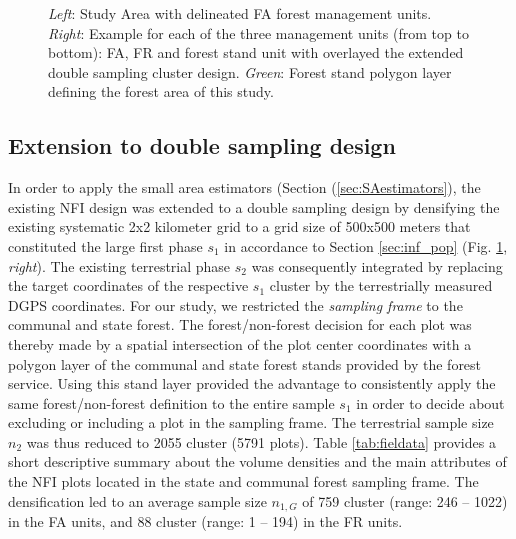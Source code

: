 \begin{figure}[H]
	\centering
	\caption{\textit{Left}: Study Area with delineated FA forest management units. \textit{Right}: Example for each of the three management units (from top to bottom): FA, FR and forest stand unit with overlayed the extended double sampling cluster design. \textit{Green}: Forest stand polygon layer defining the forest area of this study.}
	\label{fig:StudyArea}
\end{figure}

\subsection{Extension to double sampling design}
\label{ext_to_2phase}

In order to apply the small area estimators (Section (\ref{sec:SAestimators}), the existing NFI design was extended to a double sampling design by densifying the existing systematic 2x2 kilometer grid to a grid size of 500x500 meters that constituted the large first phase $s_1$ in accordance to Section \ref{sec:inf_pop} (Fig. \ref{fig:StudyArea}, \textit{right}). The existing terrestrial phase $s_2$ was consequently integrated by replacing the target coordinates of the respective $s_1$ cluster by the terrestrially measured DGPS coordinates. For our study, we restricted the \textit{sampling frame} to the communal and state forest. The forest/non-forest decision for each plot was thereby made by a spatial intersection of the plot center coordinates with a polygon layer of the communal and state forest stands provided by the forest service. Using this stand layer provided the advantage to consistently apply the same forest/non-forest definition to the entire sample $s_1$ in order to decide about excluding or including a plot in the sampling frame. The terrestrial sample size $n_2$ was thus reduced to 2055 cluster (5791 plots). Table \ref{tab:fieldata} provides a short descriptive summary about the volume densities and the main attributes of the NFI plots located in the state and communal forest sampling frame. The densification led to an average sample size $n_{1,G}$ of 759  cluster (range: 246 -- 1022) in the FA units, and 88 cluster (range: 1 -- 194) in the FR units.



